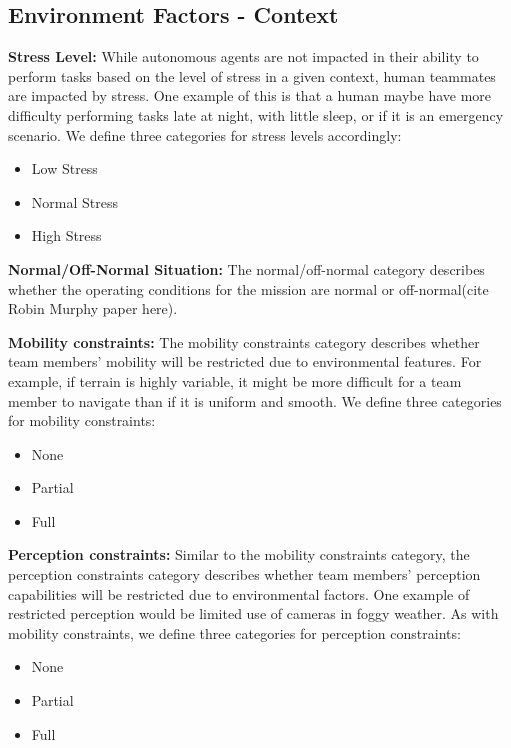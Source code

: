 \documentclass[letterpaper, 10 pt, conference]{ieeeconf}  %
\theoremstyle{definition}
\begin{document}

\subsection{Environment Factors - Context}
\textbf{Stress Level:} While autonomous agents are not impacted in their ability to perform tasks based on the level of stress in a given context, human teammates are impacted by stress. One example of this is that a human maybe have more difficulty performing tasks late at night, with little sleep, or if it is an emergency scenario. We define three categories for stress levels accordingly:
\begin{itemize}
    \item Low Stress
    \item Normal Stress
    \item High Stress
\end{itemize}


\textbf{Normal/Off-Normal Situation:} The normal/off-normal category describes whether the operating conditions for the mission are normal or off-normal(cite Robin Murphy paper here). 

\textbf{Mobility constraints:} The mobility constraints category describes whether team members' mobility will be restricted due to environmental features. For example, if terrain is highly variable, it might be more difficult for a team member to navigate than if it is uniform and smooth. We define three categories for mobility constraints:
\begin{itemize}
    \item None
    \item Partial
    \item Full
\end{itemize}

\textbf{Perception constraints:} Similar to the mobility constraints category, the perception constraints category describes whether team members' perception capabilities will be restricted due to environmental factors. One example of restricted perception would be limited use of cameras in foggy weather. As with mobility constraints, we define three categories for perception constraints:
\begin{itemize}
    \item None
    \item Partial
    \item Full
\end{itemize}
\end{document}
